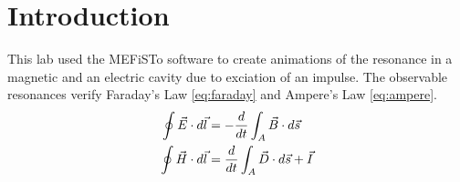 \section{Introduction}\label{sec:intro}
This lab used the MEFiSTo software to create animations of the resonance in a magnetic and an electric cavity due to exciation of an impulse. The observable resonances verify Faraday's Law \eqref{eq:faraday} and Ampere's Law \eqref{eq:ampere}. 
\begin{align}
	\oint \vec{E} \cdot d\vec{l} &= - {d \over dt} \int_A \vec{B} \cdot d\vec{s} \label{eq:faraday} \\
	\oint \vec{H} \cdot d\vec{l} &= {d \over dt} \int_A \vec{D} \cdot d\vec{s} + \vec{I} \label{eq:ampere}
\end{align}

